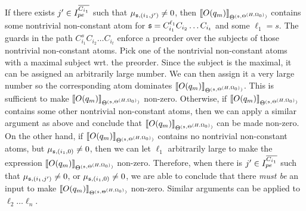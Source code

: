 If there exists $j' \in I^{\overline{C_{i_1}}}_{pe}$ such that
$\mu_{{\mathfrak{s} },(i_1,j')} \neq 0$, then $\llbracket O(q_m)\rrbracket_{\Theta^{({\mathfrak{s} },\Theta^{(H,\Omega_0)})}}$ contains some nontrivial non-constant atom for ${\mathfrak{s} }=C_{i_1}^{\ell_1} C_{i_2} \dots C_{i_t}$ and some $\ell_1=s$. The guards in the path $C_{i_1}^{s} C_{i_2} \dots C_{i_t}$ enforce a preorder over the subjects of those nontrivial non-constant atoms.
Pick one of the nontrivial non-constant atoms with a maximal subject wrt. the preorder. Since the subject is the maximal, it can be assigned an arbitrarily large number. We can then assign it a very large number so the corresponding atom dominates $\llbracket O(q_m)\rrbracket_{\Theta^{({\mathfrak{s} },\Theta^{(H,\Omega_0)})}}$.  This is sufficient to make $\llbracket O(q_m)\rrbracket_{\Theta^{({\mathfrak{s} },\Theta^{(H,\Omega_0)})}}$ non-zero.
Otherwise, if $\llbracket O(q_m)\rrbracket_{\Theta^{({\mathfrak{s} },\Theta^{(H,\Omega_0)})}}$ contains some other nontrivial non-constant atoms, then we can apply a similar argument as above and conclude that $\llbracket O(q_m)\rrbracket_{\Theta^{({\mathfrak{s} },\Theta^{(H,\Omega_0)})}}$ can be made non-zero. On the other hand, if $\llbracket O(q_m)\rrbracket_{\Theta^{({\mathfrak{s} },\Theta^{(H,\Omega_0)})}}$ contains no nontrivial non-constant atoms, but $\mu_{{\mathfrak{s} },(i_1,0)} \neq 0$, then we can let $\ell_1$ arbitrarily large to make the expression $\llbracket O(q_m)\rrbracket_{\Theta^{({\mathfrak{s} },\Theta^{(H,\Omega_0)})}}$ non-zero. Therefore, when there is $j' \in  I^{\overline{C_{i_1}}}_{pe}$ such that $\mu_{{\mathfrak{s} },(i_1,j')} \neq 0$, or $\mu_{{\mathfrak{s} },(i_1,0)} \neq 0$, we are able to conclude that there \emph{must be} an input to make $\llbracket O(q_m)\rrbracket_{\Theta^{({\mathfrak{s} },\Theta^{(H,\Omega_0)})}}$ non-zero.  Similar arguments can be applied to $\ell_2\dots\ell_n$.

\smallskip

